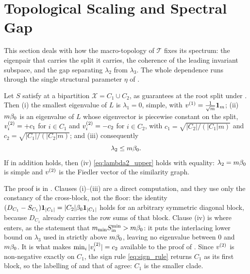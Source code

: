 \section{Topological Scaling and Spectral Gap}\label{sec:bridging}

This section deals with how the macro-topology of $\mathcal{T}$ fixes its spectrum: the eigenpair that carries the
split it carries, the coherence of the leading invariant subspace, and the gap
separating $\lambda_2$ from $\lambda_3$. The whole dependence runs through the single
structural parameter $\eta$ of .

\begin{lemma}\label{lem:A-decomp}
Let $S$ satisfy  at a bipartition $\mathcal{X}=C_1\cup C_2$, as 
guarantees at the root split
under . Then (i) the smallest eigenvalue of $L$ is
$\lambda_1=0$, simple, with $v^{(1)}=\tfrac1{\sqrt m}\mathbf{1}_m$; (ii) $m\beta_0$ is an
eigenvalue of $L$ whose eigenvector is piecewise constant on the split,
$v^{(2)}_i=+c_1$ for $i\in C_1$ and $v^{(2)}_i=-c_2$ for $i\in C_2$, with $c_1=\sqrt{|C_2|/(|C_1|m)}$
and $c_2=\sqrt{|C_1|/(|C_2|m)}$; and (iii) consequently
\begin{equation}\label{eq:lambda2_upper}
   \lambda_2 \le m\beta_0 .
\end{equation}
If in addition  holds, then (iv) \eqref{eq:lambda2_upper} holds with
equality: $\lambda_2=m\beta_0$ is simple and $v^{(2)}$ is the Fiedler vector of the
similarity graph.
\end{lemma}

\noindent The proof is in . Clauses (i)--(iii) are a direct
computation, and they use only the constancy of the cross-block, not the floor:
the identity $(D_{C_1}-S_{C_1})\mathbf{1}_{|C_1|}=|C_2|\beta_0\mathbf{1}_{|C_1|}$ holds for an arbitrary symmetric diagonal
block, because $D_{C_1}$ already carries the row sums of that block. Clause (iv) is where
 enters, as the statement that $m_{\min}S_{\mathrm{in}}^{\min}>m\beta_0$: it puts
the interlacing lower bound on $\lambda_3$ used in  strictly above
$m\beta_0$, leaving no eigenvalue between $0$ and $m\beta_0$. It is what makes
$\min_i|v^{(2)}_i|=c_2$ available to the proof of . Since $v^{(2)}$ is
non-negative exactly on $C_1$, the sign rule \eqref{eq:sign_rule} returns $C_1$ as its
first block, so the labelling of  and that of 
agree: $C_1$ is the smaller clade.

